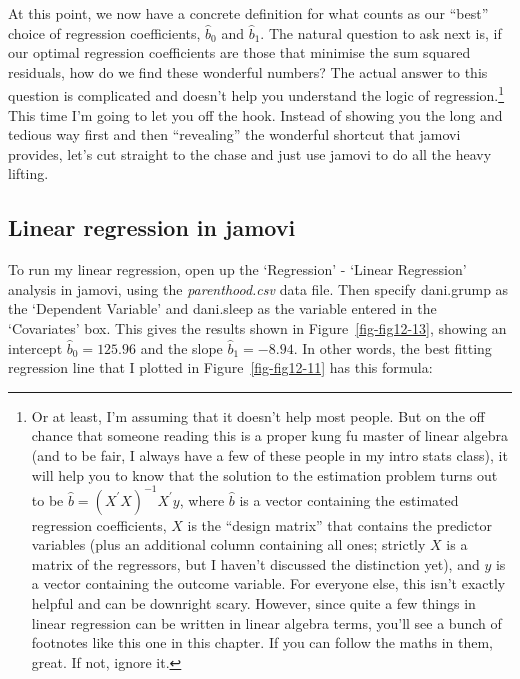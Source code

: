 \documentclass[
  a4paper,
]{book}
\begin{document}
At this point, we now have a concrete definition for what counts as our
``best'' choice of regression coefficients, \(\hat{b}_0\) and
\(\hat{b}_1\). The natural question to ask next is, if our optimal
regression coefficients are those that minimise the sum squared
residuals, how do we find these wonderful numbers? The actual answer to
this question is complicated and doesn't help you understand the logic
of regression.\footnote{Or at least, I'm assuming that it doesn't help
  most people. But on the off chance that someone reading this is a
  proper kung fu master of linear algebra (and to be fair, I always have
  a few of these people in my intro stats class), it will help you to
  know that the solution to the estimation problem turns out to be
  \(\hat{b} = (X^{'}X)^{-1}X^{'}y\), where \(\hat{b}\) is a vector
  containing the estimated regression coefficients, \(X\) is the
  ``design matrix'' that contains the predictor variables (plus an
  additional column containing all ones; strictly \(X\) is a matrix of
  the regressors, but I haven't discussed the distinction yet), and
  \(y\) is a vector containing the outcome variable. For everyone else,
  this isn't exactly helpful and can be downright scary. However, since
  quite a few things in linear regression can be written in linear
  algebra terms, you'll see a bunch of footnotes like this one in this
  chapter. If you can follow the maths in them, great. If not, ignore
  it.} This time I'm going to let you off the hook. Instead of showing
you the long and tedious way first and then ``revealing'' the wonderful
shortcut that jamovi provides, let's cut straight to the chase and just
use jamovi to do all the heavy lifting.

\hypertarget{linear-regression-in-jamovi}{%
\subsection{Linear regression in
jamovi}\label{linear-regression-in-jamovi}}

To run my linear regression, open up the `Regression' - `Linear
Regression' analysis in jamovi, using the \emph{parenthood.csv} data
file. Then specify dani.grump as the `Dependent Variable' and dani.sleep
as the variable entered in the `Covariates' box. This gives the results
shown in Figure~\ref{fig-fig12-13}, showing an intercept
\(\hat{b}_0 = 125.96\) and the slope \(\hat{b}_1 = -8.94\). In other
words, the best fitting regression line that I plotted in
Figure~\ref{fig-fig12-11} has this formula:
\end{document}
